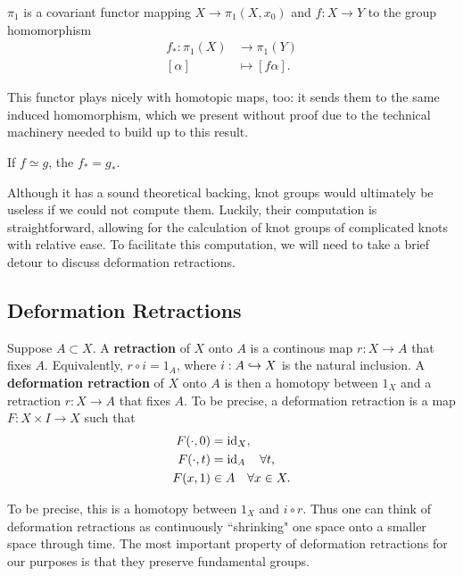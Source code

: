 \documentclass[twoside,10pt]{article}
\begin{document}
\begin{thrm}[]
	$\pi_1$ is a covariant functor mapping $X \to \pi_1(X,x_0)$ and $f:X\to Y$ to the group homomorphism
	\begin{align*}
		f_{*}: \pi_1(X) &\to \pi_1(Y) \\
		[\alpha] &\mapsto [f\alpha].
	\end{align*}
\end{thrm}

This functor plays nicely with homotopic maps, too: it sends them to the same induced homomorphism, which we present without proof due to the technical machinery needed to build up to this result.

\begin{prop}
	\label{homotopic-same-induced}
If $f \simeq g$, the $f_* = g_*$.
\end{prop}

Although it has a sound theoretical backing, knot groups would ultimately be useless if we could not compute them. Luckily, their computation is straightforward, allowing for the calculation of knot groups of complicated knots with relative ease. To facilitate this computation, we will need to take a brief detour to discuss deformation retractions.

\subsection{Deformation Retractions}

Suppose $A \subset X$. A \textbf{retraction} of $X$ onto $A$ is a continous map $r:X\to A$ that fixes $A$. Equivalently, $r \circ i = 1_{A}$, where $i:A \hookrightarrow X$ is the natural inclusion. A \textbf{deformation retraction} of $X$ onto $A$ is then a homotopy between $1_X$ and a retraction $r:X\to A$ that fixes $A$. To be precise, a deformation retraction is a map $F:X\times I \to X$ such that
\begin{align*}
	F(\cdot,0) &= \operatorname{id}_{X}, \\
	F(\cdot,t) &= \operatorname{id}_{A} \quad \forall t, \\
	F(x,1) &\in A \quad \forall x \in X.
\end{align*}

To be precise, this is a homotopy between $1_X$ and $i \circ r$. Thus one can think of deformation retractions as continuously ``shrinking" one space onto a smaller space through time. The most important property of deformation retractions for our purposes is that they preserve fundamental groups.
\end{document}
